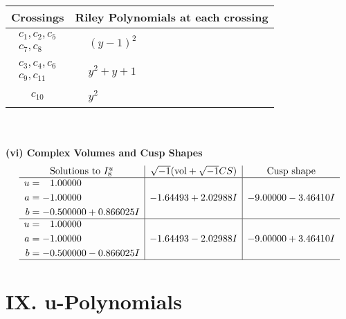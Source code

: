\documentclass[1p]{elsarticle_modified}
\theoremstyle{definition}
\newcommand{\I}{\sqrt{-1}}
\begin{document}
\begin{tabular}{m{50pt}|m{274pt}}
Crossings & \hspace{64pt}Riley Polynomials at each crossing \\
\hline $$\begin{aligned}c_{1},c_{2},c_{5}\\c_{7},c_{8}\end{aligned}$$&$\begin{aligned}
&(y-1)^2
\end{aligned}$\\
\hline $$\begin{aligned}c_{3},c_{4},c_{6}\\c_{9},c_{11}\end{aligned}$$&$\begin{aligned}
&y^2+y+1
\end{aligned}$\\
\hline $$\begin{aligned}c_{10}\end{aligned}$$&$\begin{aligned}
&y^2
\end{aligned}$\\
\hline
\end{tabular}\\~\\
\newpage\flushleft \textbf{(vi) Complex Volumes and Cusp Shapes}
$$\begin{array}{c|c|c}  
\text{Solutions to }I^u_{8}& \I (\text{vol} + \sqrt{-1}CS) & \text{Cusp shape}\\
 \hline 
\begin{aligned}
u &= \phantom{-}1.00000\phantom{ +0.000000I} \\
a &= -1.00000\phantom{ +0.000000I} \\
b &= -0.500000 + 0.866025 I\end{aligned}
 & -1.64493 + 2.02988 I & -9.00000 - 3.46410 I \\ \hline\begin{aligned}
u &= \phantom{-}1.00000\phantom{ +0.000000I} \\
a &= -1.00000\phantom{ +0.000000I} \\
b &= -0.500000 - 0.866025 I\end{aligned}
 & -1.64493 - 2.02988 I & -9.00000 + 3.46410 I\\
 \hline 
 \end{array}$$\newpage
\newpage\renewcommand{\arraystretch}{1}
\centering \section*{ IX. u-Polynomials}
\end{document}
